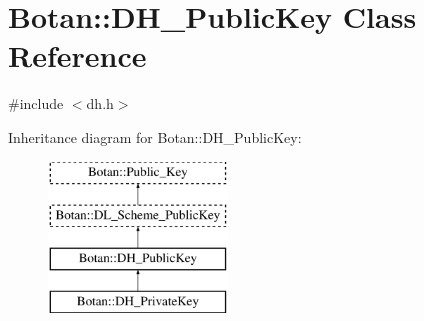 \hypertarget{classBotan_1_1DH__PublicKey}{\section{Botan\-:\-:D\-H\-\_\-\-Public\-Key Class Reference}
\label{classBotan_1_1DH__PublicKey}
}


{\ttfamily \#include $<$dh.\-h$>$}

Inheritance diagram for Botan\-:\-:D\-H\-\_\-\-Public\-Key\-:\begin{figure}[H]
\begin{center}
\leavevmode
\includegraphics[height=4.000000cm]{classBotan_1_1DH__PublicKey}
\end{center}
\end{figure}
